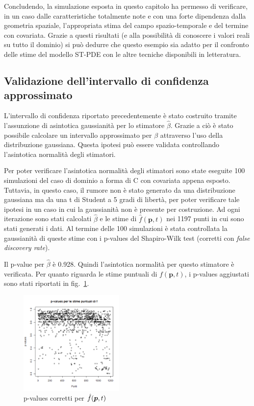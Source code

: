 \documentclass[a4paper,11pt,twoside,openright]{book}							%
\begin{document}
Concludendo, la simulazione esposta in questo capitolo ha permesso di verificare, in un caso dalle caratteristiche totalmente note e con una forte dipendenza dalla geometria spaziale, l'appropriata stima del campo spazio-temporale e del termine con covariata. Grazie a questi risultati (e alla possibilità di conoscere i valori reali su tutto il dominio) si può dedurre che questo esempio sia adatto per il confronto delle stime del modello ST-PDE con le altre tecniche disponibili in letteratura.

\subsection{Validazione dell'intervallo di confidenza approssimato}
L'intervallo di confidenza riportato precedentemente è stato costruito tramite l'assunzione di asintotica gaussianità per lo stimatore $\hat{\beta}$. Grazie a ciò è stato possibile calcolare un intervallo approssimato per $\beta$ attraverso l'uso della distribuzione gaussiana. Questa ipotesi può essere validata controllando l'asintotica normalità degli stimatori.

Per poter verificare l'asintotica normalità degli stimatori sono state eseguite 100 simulazioni del caso di dominio a forma di C con covariata appena esposto. Tuttavia, in questo caso, il rumore non è stato generato da una distribuzione gaussiana ma da una t di Student a 5 gradi di libertà, per poter verificare tale ipotesi in un caso in cui la gaussianità non è presente per costruzione. Ad ogni iterazione sono stati calcolati $\hat{\beta}$ e le stime di $\hat{f}(\bm p,t)$ nei 1197 punti in cui sono stati generati i dati. Al termine delle 100 simulazioni è stata controllata la gaussianità di queste stime con i p-values del Shapiro-Wilk test (corretti con \textit{false discovery rate}). 

Il p-value per $\hat{\beta}$ è 0.928. Quindi l'asintotica normalità per questo stimatore è verificata. Per quanto riguarda le stime puntuali di $f(\bm p,t)$, i p-values aggiustati sono stati riportati in fig.~\ref{fig:pval}.
\begin{figure}[h]
	\centering
	\includegraphics[width=0.46\textwidth]{Immagini/pval.png}  
	\caption{p-values corretti per $\protect\hat{f}(\bm p,t)$}
		\label{fig:pval}
\end{figure}
\end{document}
